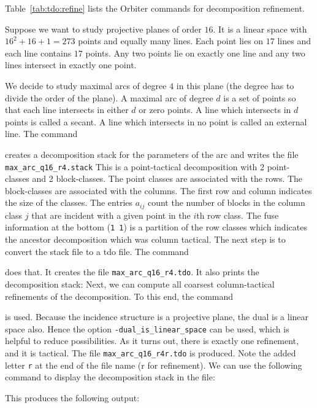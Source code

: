 Table~\ref{tab:tdo:refine} lists the Orbiter commands for decomposition refinement.

\bigskip

Suppose we want to study projective planes of order $16.$ 
It is a linear space with $16^2+16+1=273$ points and equally many lines. 
Each point lies on $17$ lines and each line contains $17$ points. 
Any two points lie on exactly one line 
and any two lines intersect in exactly one point.

\bigskip

We decide to 
study maximal arcs of degree $4$ in this plane 
(the degree has to divide the order of the plane).
A maximal arc of degree $d$ is a set of points 
so that each line intersects in either $d$ or zero points.
A line which intersects in $d$ points is called a secant.  
A line which intersects in no point is called an external line.
The command 


creates a decomposition stack for the parameters of the arc and writes the file \verb'max_arc_q16_r4.stack' 
This is a point-tactical decomposition with 2 point-classes and 2 block-classes. 
The point classes are associated with the rows. 
The block-classes are associated with the columns. 
The first row and column indicates the size of the classes.
The entries $a_{ij}$ count the number of blocks in the column class $j$ 
that are incident with a given point in the $i$th row  class.
The fuse information at the bottom (\verb'1 1') 
is a partition of the row classes which indicates the ancestor decomposition which was column tactical.
The next step is to convert the stack file to a tdo file.
The command


does that. 
It creates the file \verb'max_arc_q16_r4.tdo'. It also 
prints the decomposition stack:
Next, we can compute all coarsest column-tactical refinements of the decomposition. 
To this end, the command 


is used. 
Because the incidence structure is a projective plane, 
the dual is a linear space also. 
Hence the option \verb'-dual_is_linear_space' can be used, which is helpful to reduce possibilities. 
As it turns out, there is exactly one refinement, and it is tactical. 
The file \verb'max_arc_q16_r4r.tdo' is produced. 
Note the added letter \verb'r' at the end of the file name (r for refinement).
We can use the following command to display the decomposition stack in the file:


This produces the following output:


